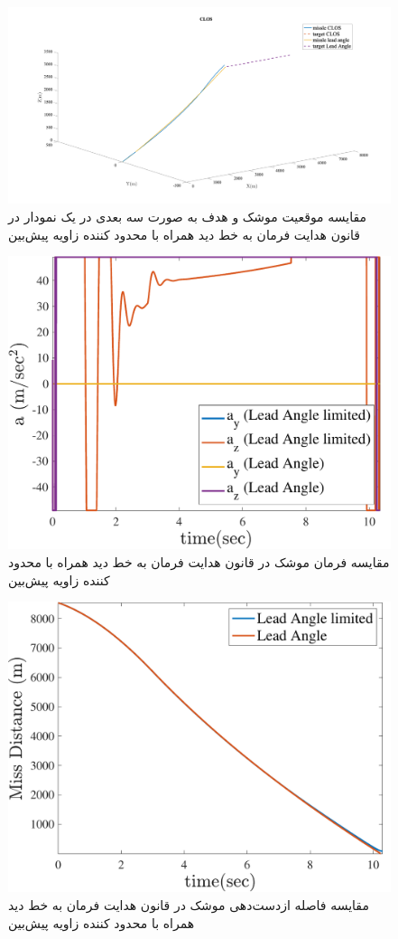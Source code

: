 \begin{figure}[H]
	\centering
	\includegraphics[width=\linewidth]{../Figure/l/3DoF_missle_vs_target_state_lead_angle_limited_all_in}
	\caption{مقایسه موقعیت موشک و هدف به صورت سه بعدی در یک نمودار در قانون هدایت فرمان به خط دید همراه با محدود کننده زاویه پیش‌بین
	}
\end{figure}

\begin{figure}[H]
	\centering
	\includegraphics[width=.75\linewidth]{../Figure/l/command}
	\caption{مقایسه فرمان موشک در قانون هدایت فرمان به خط دید همراه با محدود کننده زاویه پیش‌بین}
	
\end{figure}

\begin{figure}[H]
	\centering
	\includegraphics[width=.75\linewidth]{../Figure/l/miss_distance}
	\caption{مقایسه فاصله ازدست‌دهی موشک در قانون هدایت فرمان به خط دید همراه با محدود کننده زاویه پیش‌بین}
\end{figure}

